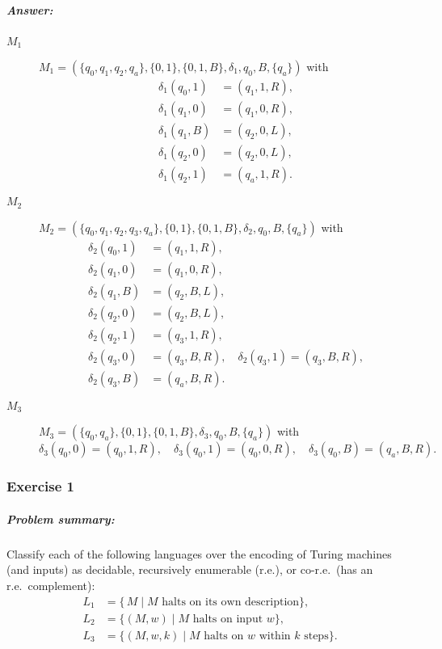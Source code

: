 \documentclass{article}
\begin{document}
\subparagraph*{Answer:}
\begin{description}
  \item[\(M_1\)]  
  \(M_1=(\{q_0,q_1,q_2,q_a\},\{0,1\},\{0,1,B\},\delta_1,q_0,B,\{q_a\})\) with
  \[
    \begin{aligned}
      \delta_1(q_0,1)&=(q_1,1,R),\\
      \delta_1(q_1,0)&=(q_1,0,R),\\
      \delta_1(q_1,B)&=(q_2,0,L),\\
      \delta_1(q_2,0)&=(q_2,0,L),\\
      \delta_1(q_2,1)&=(q_a,1,R).
    \end{aligned}
  \]
  \item[\(M_2\)]  
  \(M_2=(\{q_0,q_1,q_2,q_3,q_a\},\{0,1\},\{0,1,B\},\delta_2,q_0,B,\{q_a\})\) with
  \[
    \begin{aligned}
      \delta_2(q_0,1)&=(q_1,1,R),\\
      \delta_2(q_1,0)&=(q_1,0,R),\\
      \delta_2(q_1,B)&=(q_2,B,L),\\
      \delta_2(q_2,0)&=(q_2,B,L),\\
      \delta_2(q_2,1)&=(q_3,1,R),\\
      \delta_2(q_3,0)&=(q_3,B,R),\quad
      \delta_2(q_3,1)=(q_3,B,R),\\
      \delta_2(q_3,B)&=(q_a,B,R).
    \end{aligned}
  \]
  \item[\(M_3\)]  
  \(M_3=(\{q_0,q_a\},\{0,1\},\{0,1,B\},\delta_3,q_0,B,\{q_a\})\) with
  \[
    \delta_3(q_0,0)=(q_0,1,R),\quad
    \delta_3(q_0,1)=(q_0,0,R),\quad
    \delta_3(q_0,B)=(q_a,B,R).
  \]
\end{description}

\subsubsection*{Exercise 1}
\subparagraph*{Problem summary:}  
Classify each of the following languages over the encoding of Turing machines (and inputs) as decidable, recursively enumerable (r.e.), or co-r.e.\ (has an r.e.\ complement):
\[
  \begin{aligned}
    L_1 &= \{\,M \mid M\text{ halts on its own description}\},\\
    L_2 &= \{(M,w)\mid M\text{ halts on input }w\},\\
    L_3 &= \{(M,w,k)\mid M\text{ halts on }w\text{ within }k\text{ steps}\}.
  \end{aligned}
\]
\end{document}
